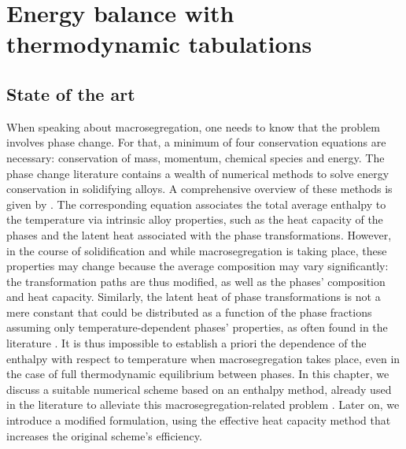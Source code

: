 \chapter{Energy balance with thermodynamic tabulations}
\begin{nolinkcolors} 
\minitoc
\end{nolinkcolors}
\newpage
%
%
\section{State of the art}
%
When speaking about macrosegregation, one needs to know that the problem involves phase change.
For that, a minimum of four conservation equations are necessary:
conservation  of  mass, momentum,  chemical  species and  energy. The  phase  change
literature  contains a  wealth of numerical methods to solve energy conservation
in solidifying alloys. A comprehensive overview of these methods is given by \citet{swaminathan._enthalpy_1993}.
The corresponding equation associates the total average enthalpy to the
temperature  via  intrinsic  alloy  properties, such  as the heat  capacity of  the
phases and the latent  heat associated with the phase transformations. However, in the course
of solidification and while macrosegregation is taking place, these  properties may change because the average
composition may  vary  significantly: the  transformation paths are thus modified, as well as
the phases' composition and heat capacity. Similarly, the latent heat of phase  transformations
is  not a mere constant that could be distributed as a function of the phase fractions
assuming only temperature-dependent phases' properties, as often found in the literature \citep{bellet_call_2009}.
It is thus impossible to establish a priori the dependence of the enthalpy with respect
to temperature when macrosegregation takes place, even in the case of full thermodynamic equilibrium
between phases. In this chapter, we discuss a suitable numerical scheme based on an enthalpy method,
already used in the literature  to  alleviate this macrosegregation-related problem \citep{swaminathan._enthalpy_1993,
carozzani_direct_2013}. Later on, we introduce a modified formulation, using the effective heat capacity method that 
increases the original scheme's efficiency. 

